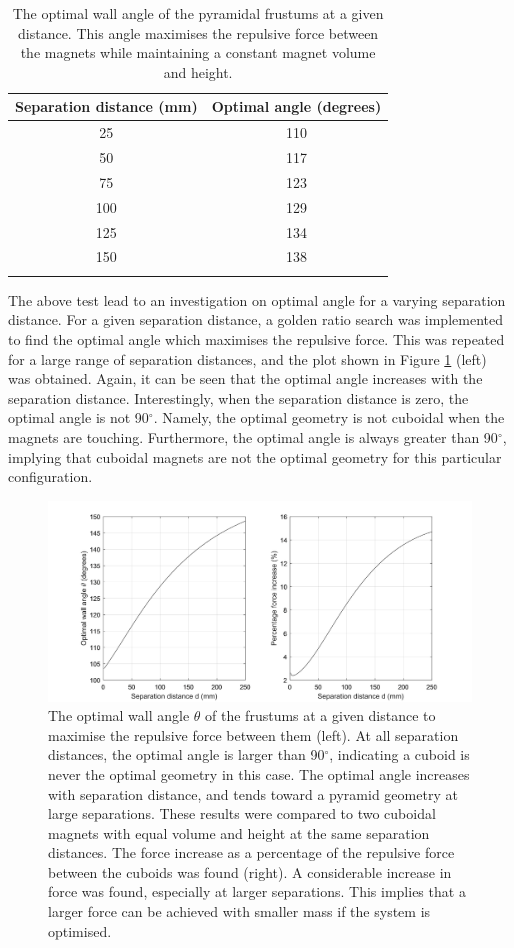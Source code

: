 \begin{table}
	\centering
	\caption{The optimal wall angle of the pyramidal frustums at a given distance. This angle maximises the repulsive force between the magnets while maintaining a constant magnet volume and height.}
	\begin{tabular}{cc}
		\hline
		Separation distance (mm) & Optimal angle (degrees) \\
		\hline
		25 & 110 \\
		50 & 117 \\
		75 & 123 \\
		100 & 129 \\
		125 & 134 \\
		150 & 138 \\
		\hline
		\label{tab:p1optimalfrustum}
	\end{tabular}
\end{table}

The above test lead to an investigation on optimal angle for a varying separation distance. For a given separation distance, a golden ratio search was implemented to find the optimal angle which maximises the repulsive force. This was repeated for a large range of separation distances, and the plot shown in Figure \ref{fig:p1optimalfrustum} (left) was obtained. Again, it can be seen that the optimal angle increases with the separation distance. Interestingly, when the separation distance is zero, the optimal angle is not 90\(^\circ\). Namely, the optimal geometry is not cuboidal when the magnets are touching. Furthermore, the optimal angle is always greater than 90\(^\circ\), implying that cuboidal magnets are not the optimal geometry for this particular configuration.
\begin{figure}
	\centering
	\includegraphics[trim = 4cm 0cm 4cm 0cm,width=\linewidth]{p1/p1FIG9}
	\caption{The optimal wall angle \(\theta\) of the frustums at a given distance to maximise the repulsive force between them (left). At all separation distances, the optimal angle is larger than 90\(^\circ\), indicating a cuboid is never the optimal geometry in this case. The optimal angle increases with separation distance, and tends toward a pyramid geometry at large separations. These results were compared to two cuboidal magnets with equal volume and height at the same separation distances. The force increase as a percentage of the repulsive force between the cuboids was found (right). A considerable increase in force was found, especially at larger separations. This implies that a larger force can be achieved with smaller mass if the system is optimised.}
	\label{fig:p1optimalfrustum}
\end{figure}

